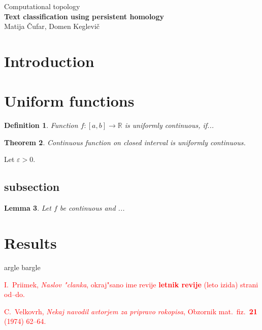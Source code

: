 \documentclass[12pt,a4paper]{amsart}
\newtheorem{definition}{Definition}[section]
\newtheorem{lemma}[definition]{Lemma}
\newtheorem{theorem}[definition]{Theorem}
\def\R{\mathbb R}
\begin{document}
\thispagestyle{empty}
\begin{center}{\large
Computational topology\\[4mm]
{\bf Text classification using persistent homology}\\[4mm]
Matija Čufar, Domen Keglevič\\[6mm]
}
\end{center}
\bigskip
\section{Introduction}

\section{Uniform functions}

\begin{definition}
Function $f\colon [a,b]\to\R$ is {\em uniformly continuous}, if...
\end{definition}
%
\begin{theorem}
Continuous function on closed interval is uniformly continuous.
\end{theorem}
%
\proof
Let $\varepsilon>0$.
\endproof

\subsection{subsection}

\begin{lemma}
Let $f$ be continuous and ...
\end{lemma}

\section{Results}

argle bargle

\begin{thebibliography}{99}

\textcolor{Red}{I.~Priimek, {\em Naslov "clanka}, okraj"sano ime revije {\bf letnik revije} (leto izida) strani od--do.}

\textcolor{Red}{C.~Velkovrh, {\em Nekaj navodil avtorjem za pripravo rokopisa}, Obzornik mat.\ fiz.\ {\bf 21} (1974) 62--64.}

\end{thebibliography}
\end{document}
